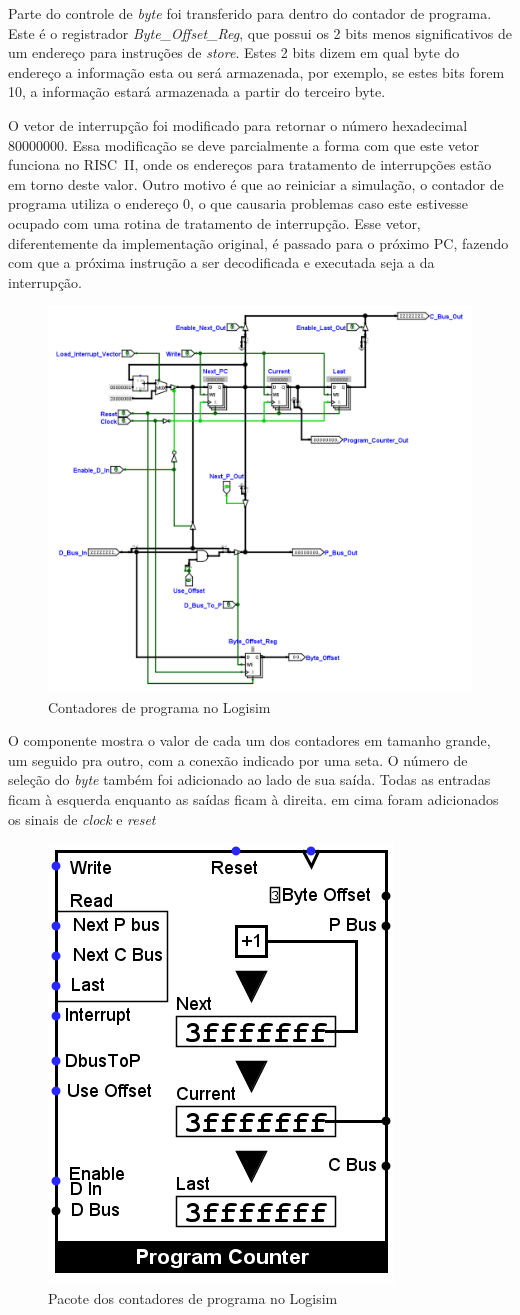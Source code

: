 \documentclass[
	article,			%
	11pt,				%
	oneside,			%
	a4paper,			%
	english,			%
	brazil,				%
	sumario=tradicional
	]{abntex2}
\begin{document}
Parte do controle de \textit{byte} foi transferido para dentro do contador de programa. Este é o registrador \textit{Byte\_Offset\_Reg}, que possui os 2 bits menos significativos de um endereço para instruções de \textit{store}. Estes 2 bits dizem em qual byte do endereço a informação esta ou será armazenada, por exemplo, se estes bits forem 10, a informação estará armazenada a partir do terceiro byte.

O vetor de interrupção foi modificado para retornar o número hexadecimal 80000000. Essa modificação se deve parcialmente a forma com que este vetor funciona no RISC~II, onde os endereços para tratamento de interrupções estão em torno deste valor\cite[p.~198]{katevenis_reduced_1985}. Outro motivo é que ao reiniciar a simulação, o contador de programa utiliza o endereço 0, o que causaria problemas caso este estivesse ocupado com uma rotina de tratamento de interrupção. Esse vetor, diferentemente da implementação original, é passado para o próximo PC, fazendo com que a próxima instrução a ser decodificada e executada seja a da interrupção.

\begin{figure}[H]
    \centering
    \includegraphics[width=0.75\linewidth]{Logisim/pc.png}
    \caption{Contadores de programa no Logisim}
    \label{fig:pc}
\end{figure}
O componente mostra o valor de cada um dos contadores em tamanho grande, um seguido pra outro, com a conexão indicado por uma seta. O número de seleção do \textit{byte} também foi adicionado ao lado de sua saída. Todas as entradas ficam à esquerda enquanto as saídas ficam à direita. em cima foram adicionados os sinais de \textit{clock} e \textit{reset}
\begin{figure}[H]
    \centering
    \includegraphics[width=0.25\linewidth]{Logisim/pcPack.png}
    \caption{Pacote dos contadores de programa no Logisim}
    \label{fig:pcPack}
\end{figure}
\end{document}
